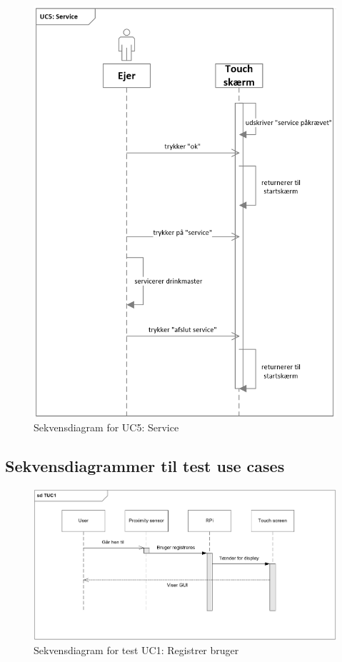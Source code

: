 \begin{figure}[H]
	\centering
	\includegraphics[width=1\textwidth]{Images/UC5service.png}
	\caption{Sekvensdiagram for UC5: Service}
	\label{fig:UC2_service}
\end{figure}

\subsection{Sekvensdiagrammer til test use cases}

\begin{figure}[H]
	\centering
	\includegraphics[width=1\textwidth]{Images/TUC1.png}
	\caption{Sekvensdiagram for test UC1: Registrer bruger}
	\label{fig:testUC1}
\end{figure}

